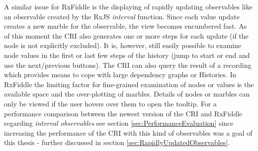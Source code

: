	A similar issue for RxFiddle is the displaying of rapidly updating observables like an observable created by the RxJS \emph{interval} function. Since each value update creates a new marble for the observable, the view becomes encumbered fast. As of this moment the CRI also generates one or more steps for each update (if the node is not explicitly excluded). It is, however, still easily possible to examine node values in the first or last few steps of the history (jump to start or end and use the next/previous buttons). The CRI can also query the result of a recording which provides means to cope with large dependency graphs or Histories. In RxFiddle the limiting factor for  fine-grained examination of nodes or values is the available space and the over-plotting of marbles. Details of nodes or marbles can only be viewed if the user hovers over them to open the tooltip. For a performance comparison between the newest version of the CRI and RxFiddle regarding \emph{interval observables} see section \ref{sec:PerformanceEvaluation} since increasing the performance of the CRI with this kind of observables was a goal of this thesis - further discussed in section \ref{sec:RapidlyUpdatedObservables}.